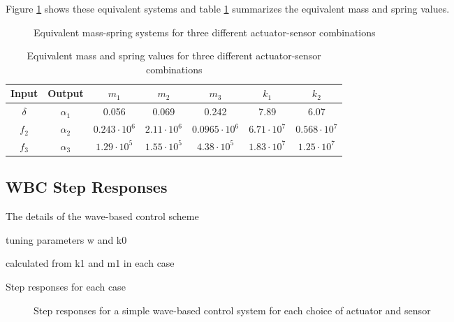 \documentclass{mbd_fullpaper}
\begin{document}
Figure \ref{fig:rocket-trans} shows these equivalent systems and table \ref{tab:equiv_vals} summarizes the equivalent mass and spring values.
\begin{figure}[h]
  \begin{center}
    
    \caption{Equivalent mass-spring systems for three different actuator-sensor combinations \label{fig:rocket-trans}}
  \end{center}
\end{figure}
\renewcommand{\arraystretch}{1.5}
\begin{table}[!ht]
  \begin{center}
    \caption{Equivalent mass and spring values for three different actuator-sensor combinations \label{tab:equiv_vals}}
    \vspace{1mm}
    \begin{tabular}{ ccccccc }
	\hline
           Input & Output & $m_1$ & $m_2$ & $m_3$ & $k_1$ & $k_2$ \\
	\hline
      	$\delta$ & $\alpha_1$ & 0.056 & 0.069 & 0.242 & 7.89 & 6.07  \\
      	$f_2$ & $\alpha_2$ & $0.243\cdot 10^6$ & $2.11\cdot 10^6$ & $0.0965\cdot 10^6$ & $6.71\cdot 10^7$ & $0.568\cdot 10^7$ \\
      	$f_3$ & $\alpha_3$ & $1.29\cdot 10^5$ & $1.55\cdot 10^5$ & $4.38\cdot 10^5$ & $1.83\cdot 10^7$ & $1.25\cdot 10^7$ \\
    \end{tabular}
  \end{center}
\end{table}

\subsection{WBC Step Responses}
The details of the wave-based control scheme

tuning parameters w and k0

calculated from k1 and m1 in each case

Step responses for each case

\begin{figure}[H]
  \begin{center}
    \subfigure{ \label{fig:graphdel}}   
    \subfigure{ \label{fig:graphf2}}
	\subfigure{ \label{fig:graphf3}}
    \caption{Step responses for a simple wave-based control system for each choice of actuator and sensor \label{fig:graphs}}
  \end{center}
\end{figure}
\end{document}
